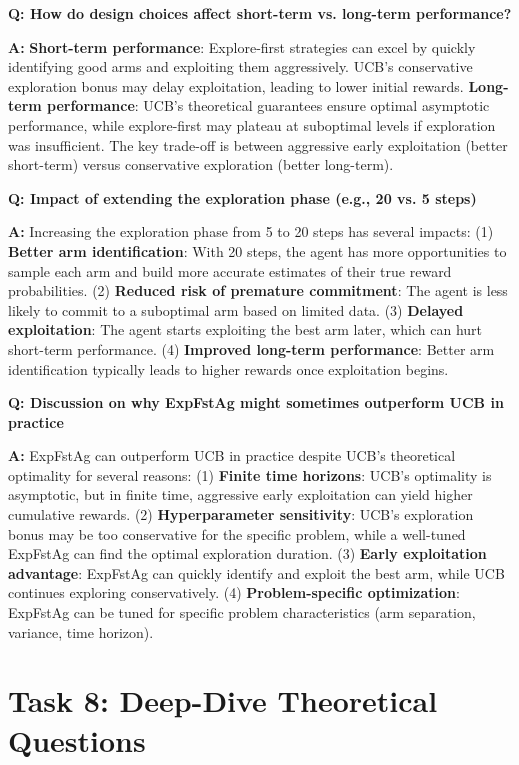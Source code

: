 \documentclass[12pt]{article}
\begin{document}
{{{\textbf{Q: How do design choices affect short-term vs. long-term performance?}

\textbf{A:} \textbf{Short-term performance}: Explore-first strategies can excel by quickly identifying good arms and exploiting them aggressively. UCB's conservative exploration bonus may delay exploitation, leading to lower initial rewards. \textbf{Long-term performance}: UCB's theoretical guarantees ensure optimal asymptotic performance, while explore-first may plateau at suboptimal levels if exploration was insufficient. The key trade-off is between aggressive early exploitation (better short-term) versus conservative exploration (better long-term).

\textbf{Q: Impact of extending the exploration phase (e.g., 20 vs. 5 steps)}

\textbf{A:} Increasing the exploration phase from 5 to 20 steps has several impacts: (1) \textbf{Better arm identification}: With 20 steps, the agent has more opportunities to sample each arm and build more accurate estimates of their true reward probabilities. (2) \textbf{Reduced risk of premature commitment}: The agent is less likely to commit to a suboptimal arm based on limited data. (3) \textbf{Delayed exploitation}: The agent starts exploiting the best arm later, which can hurt short-term performance. (4) \textbf{Improved long-term performance}: Better arm identification typically leads to higher rewards once exploitation begins.

\textbf{Q: Discussion on why ExpFstAg might sometimes outperform UCB in practice}

\textbf{A:} ExpFstAg can outperform UCB in practice despite UCB's theoretical optimality for several reasons: (1) \textbf{Finite time horizons}: UCB's optimality is asymptotic, but in finite time, aggressive early exploitation can yield higher cumulative rewards. (2) \textbf{Hyperparameter sensitivity}: UCB's exploration bonus may be too conservative for the specific problem, while a well-tuned ExpFstAg can find the optimal exploration duration. (3) \textbf{Early exploitation advantage}: ExpFstAg can quickly identify and exploit the best arm, while UCB continues exploring conservatively. (4) \textbf{Problem-specific optimization}: ExpFstAg can be tuned for specific problem characteristics (arm separation, variance, time horizon).

\section{Task 8: Deep-Dive Theoretical Questions}

}}}
\end{document}
